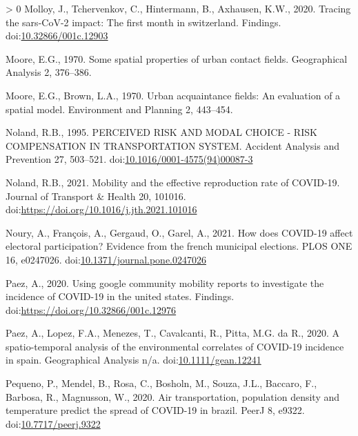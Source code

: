 \documentclass[]{elsarticle} %
\newlength{\cslhangindent}
\newenvironment{CSLReferences}[3] %
 {%
  \setlength{\parindent}{0pt}
  \ifodd #1 \everypar{\setlength{\hangindent}{\cslhangindent}}\ignorespaces\fi
  \ifnum #2 > 0
  \setlength{\parskip}{#2\baselineskip}
  \fi
 }%
 {}
\begin{document}
\begin{CSLReferences}{1}{0}
\leavevmode\hypertarget{ref-Molloy2020Tracing}{}%
Molloy, J., Tchervenkov, C., Hintermann, B., Axhausen, K.W., 2020.
Tracing the sars-CoV-2 impact: The first month in switzerland. Findings.
doi:\href{https://doi.org/10.32866/001c.12903}{10.32866/001c.12903}

\leavevmode\hypertarget{ref-Moore1970some}{}%
Moore, E.G., 1970. Some spatial properties of urban contact fields.
Geographical Analysis 2, 376--386.

\leavevmode\hypertarget{ref-Moore1970urban}{}%
Moore, E.G., Brown, L.A., 1970. Urban acquaintance fields: An evaluation
of a spatial model. Environment and Planning 2, 443--454.

\leavevmode\hypertarget{ref-Noland1995perceived}{}%
Noland, R.B., 1995. PERCEIVED RISK AND MODAL CHOICE - RISK COMPENSATION
IN TRANSPORTATION SYSTEM. Accident Analysis and Prevention 27, 503--521.
doi:\href{https://doi.org/10.1016/0001-4575(94)00087-3}{10.1016/0001-4575(94)00087-3}

\leavevmode\hypertarget{ref-Noland2021mobility}{}%
Noland, R.B., 2021. Mobility and the effective reproduction rate of
COVID-19. Journal of Transport \& Health 20, 101016.
doi:\url{https://doi.org/10.1016/j.jth.2021.101016}

\leavevmode\hypertarget{ref-Noury2021how}{}%
Noury, A., François, A., Gergaud, O., Garel, A., 2021. How does COVID-19
affect electoral participation? Evidence from the french municipal
elections. PLOS ONE 16, e0247026.
doi:\href{https://doi.org/10.1371/journal.pone.0247026}{10.1371/journal.pone.0247026}

\leavevmode\hypertarget{ref-Paez2020using}{}%
Paez, A., 2020. Using google community mobility reports to investigate
the incidence of COVID-19 in the united states. Findings.
doi:\url{https://doi.org/10.32866/001c.12976}

\leavevmode\hypertarget{ref-Paez2020spatio}{}%
Paez, A., Lopez, F.A., Menezes, T., Cavalcanti, R., Pitta, M.G. da R.,
2020. A spatio-temporal analysis of the environmental correlates of
COVID-19 incidence in spain. Geographical Analysis n/a.
doi:\href{https://doi.org/10.1111/gean.12241}{10.1111/gean.12241}

\leavevmode\hypertarget{ref-Pequeno2020air}{}%
Pequeno, P., Mendel, B., Rosa, C., Bosholn, M., Souza, J.L., Baccaro,
F., Barbosa, R., Magnusson, W., 2020. Air transportation, population
density and temperature predict the spread of COVID-19 in brazil. PeerJ
8, e9322.
doi:\href{https://doi.org/10.7717/peerj.9322}{10.7717/peerj.9322}


\end{CSLReferences}
\end{document}
